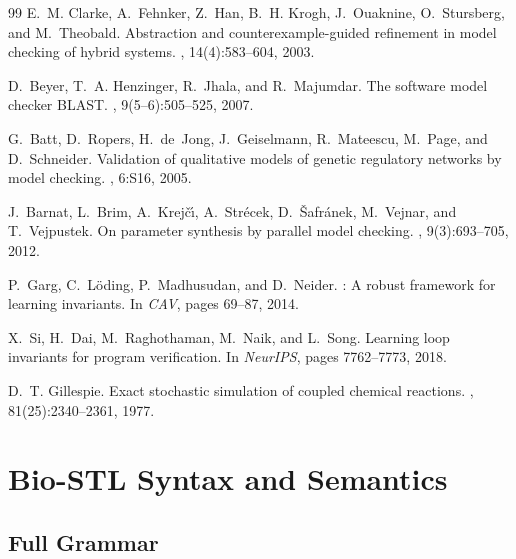 \documentclass[11pt]{article}
\begin{document}
\begin{thebibliography}{99}
E.~M. Clarke, A.~Fehnker, Z.~Han, B.~H. Krogh, J.~Ouaknine, O.~Stursberg,
  and M.~Theobald.
\newblock Abstraction and counterexample-guided refinement in model checking of
  hybrid systems.
, 14(4):583--604, 2003.

D.~Beyer, T.~A. Henzinger, R.~Jhala, and R.~Majumdar.
\newblock The software model checker {BLAST}.
, 9(5--6):505--525, 2007.

G.~Batt, D.~Ropers, H.~de~Jong, J.~Geiselmann, R.~Mateescu, M.~Page, and
  D.~Schneider.
\newblock Validation of qualitative models of genetic regulatory networks by
  model checking.
, 6:S16, 2005.

J.~Barnat, L.~Brim, A.~Krej{\v{c}}{\'\i}, A.~Str{\'e}cek, D.~{\v{S}}afr{\'a}nek,
  M.~Vejnar, and T.~Vejpustek.
\newblock On parameter synthesis by parallel model checking.
, 9(3):693--705, 2012.

P.~Garg, C.~L{\"o}ding, P.~Madhusudan, and D.~Neider.
: A robust framework for learning invariants.
\newblock In {\em CAV}, pages 69--87, 2014.

X.~Si, H.~Dai, M.~Raghothaman, M.~Naik, and L.~Song.
\newblock Learning loop invariants for program verification.
\newblock In {\em NeurIPS}, pages 7762--7773, 2018.

D.~T. Gillespie.
\newblock Exact stochastic simulation of coupled chemical reactions.
, 81(25):2340--2361, 1977.

\end{thebibliography}

\newpage
\appendix

\section{Bio-STL Syntax and Semantics}
\label{app:biostl}

\subsection{Full Grammar}
\end{document}
